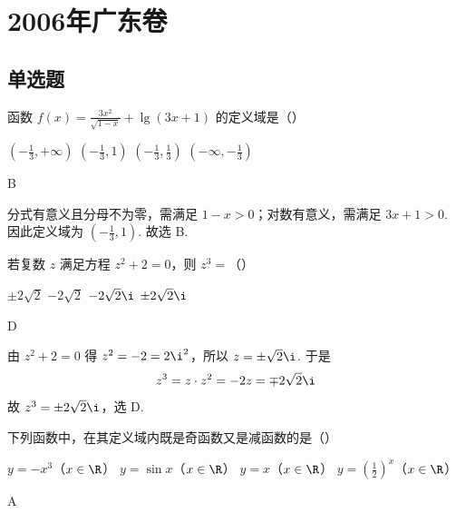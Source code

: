\chapter{2006年广东卷}
\section{单选题}
\begin{problem}
函数 \( f(x) = \frac{3x^2}{\sqrt{1 - x}} + \lg (3x + 1) \) 的定义域是（\quad）

\choices
    {\(\left(-\frac{1}{3}, +\infty\right)\)}
    {\(\left(-\frac{1}{3}, 1\right)\)}
    {\(\left(-\frac{1}{3}, \frac{1}{3}\right)\)}
    {\(\left(-\infty, -\frac{1}{3}\right)\)}
\end{problem}

\begin{answer}
B
\end{answer}

\begin{solution}
分式有意义且分母不为零，需满足 \(1-x>0\)；对数有意义，需满足 \(3x+1>0\). 因此定义域为
\(\left(-\frac{1}{3},1\right)\).
故选 B.
\end{solution}

\begin{problem}
若复数 \(z\) 满足方程 \(z^2 + 2 = 0\)，则 \(z^3 =\)（\quad）

\choices
    {\(\pm 2\sqrt{2}\)}
    {\(-2\sqrt{2}\)}
    {\(-2\sqrt{2}\i\)}
    {\(\pm 2\sqrt{2}\i\)}
\end{problem}

\begin{answer}
D
\end{answer}

\begin{solution}
由 \(z^2+2=0\) 得 \(z^2=-2=2\i^2\)，所以 \(z=\pm\sqrt{2}\i\). 于是
\[
z^3=z\cdot z^2=-2z=\mp2\sqrt{2}\i
\]
故 \(z^3=\pm2\sqrt{2}\i\)，选 D.
\end{solution}

\begin{problem}
下列函数中，在其定义域内既是奇函数又是减函数的是（\quad）

\choices
    {\(y = -x^{3}\)（\(x \in \R\)）}
    {\(y = \sin x\)（\(x \in \R\)）}
    {\(y = x\)（\(x \in \R\)）}
    {\(y = \left(\frac{1}{2}\right)^x\)（\(x \in \R\)）}
\end{problem}

\begin{answer}
A
\end{answer}

